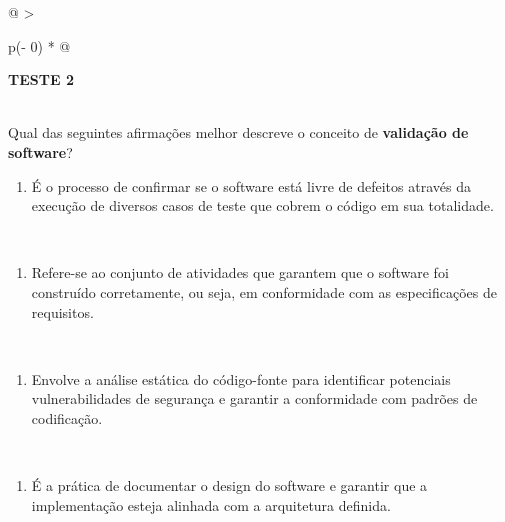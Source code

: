 \documentclass[
]{book}
\providecommand{\tightlist}{%
  \setlength{\itemsep}{0pt}\setlength{\parskip}{0pt}}
\begin{document}
\begin{longtable}[]{@{}
  >{\raggedright\arraybackslash}p{(\columnwidth - 0\tabcolsep) * }@{}}
\toprule\noalign{}
\begin{minipage}[b]{\linewidth}\raggedright
\textbf{TESTE 2}
\end{minipage} \\
\midrule\noalign{}
\endhead
\bottomrule\noalign{}
\endlastfoot
Qual das seguintes afirmações melhor descreve o conceito de \textbf{validação de software}? \\
\begin{minipage}[t]{\linewidth}\raggedright
\begin{enumerate}
\def\labelenumi{\Alph{enumi})}
\tightlist
\item
  É o processo de confirmar se o software está livre de defeitos através da execução de diversos casos de teste que cobrem o código em sua totalidade.
\end{enumerate}
\end{minipage} \\
\begin{minipage}[t]{\linewidth}\raggedright
\begin{enumerate}
\def\labelenumi{\Alph{enumi})}
\setcounter{enumi}{1}
\tightlist
\item
  Refere-se ao conjunto de atividades que garantem que o software foi construído corretamente, ou seja, em conformidade com as especificações de requisitos.
\end{enumerate}
\end{minipage} \\
\begin{minipage}[t]{\linewidth}\raggedright
\begin{enumerate}
\def\labelenumi{\Alph{enumi})}
\setcounter{enumi}{2}
\tightlist
\item
  Envolve a análise estática do código-fonte para identificar potenciais vulnerabilidades de segurança e garantir a conformidade com padrões de codificação.
\end{enumerate}
\end{minipage} \\
\begin{minipage}[t]{\linewidth}\raggedright
\begin{enumerate}
\def\labelenumi{\Alph{enumi})}
\setcounter{enumi}{3}
\tightlist
\item
  É a prática de documentar o design do software e garantir que a implementação esteja alinhada com a arquitetura definida.

\end{enumerate}
\end{minipage}
\end{longtable}
\end{document}
